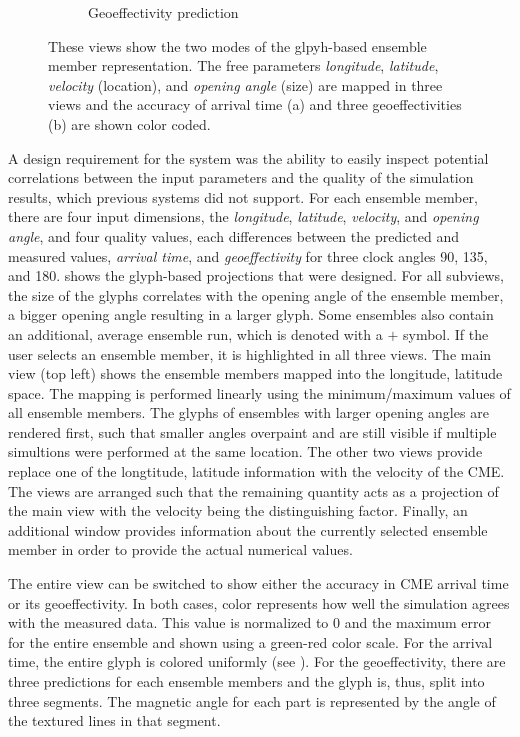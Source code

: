 \begin{figure}
\begin{subfigure}[b]{0.32\textwidth}
    \caption{Geoeffectivity prediction}
    \label{contributions:astro:spaceweather:ensemble:kp}
\end{subfigure}
\caption{These views show the two modes of the glpyh-based ensemble member representation.  The free parameters \emph{longitude}, \emph{latitude}, \emph{velocity} (location), and \emph{opening angle} (size) are mapped in three views and the accuracy of arrival time (a) and three geoeffectivities (b) are shown color coded.}
\label{contributions:astro:spaceweather:ensemble}
\end{figure}

A design requirement for the system was the ability to easily inspect potential correlations between the input parameters and the quality of the simulation results, which previous systems did not support.  For each ensemble member, there are four input dimensions, the \emph{longitude}, \emph{latitude}, \emph{velocity}, and \emph{opening angle}, and four quality values, each differences between the predicted and measured values, \emph{arrival time}, and \emph{geoeffectivity} for three clock angles 90\textdegree , 135\textdegree , and 180\textdegree .   shows the  glyph-based projections that were designed.  For all subviews, the size of the glyphs correlates with the opening angle of the ensemble member, a bigger opening angle resulting in a larger glyph.  Some ensembles also contain an additional, average ensemble run, which is denoted with a $+$ symbol.  If the user selects an ensemble member, it is highlighted in all three views.  The main view (top left) shows the ensemble members mapped into the longitude, latitude space.  The mapping is performed linearly using the minimum/maximum values of all ensemble members.  The glyphs of ensembles with larger opening angles are rendered first, such that smaller angles overpaint and are still visible if multiple simultions were performed at the same location.  The other two views provide replace one of the longtitude, latitude information with the velocity of the CME.  The views are arranged such that the remaining quantity acts as a projection of the main view with the velocity being the distinguishing factor.  Finally, an additional window provides information about the currently selected ensemble member in order to provide the actual numerical values.

The entire view can be switched to show either the accuracy in CME arrival time or its geoeffectivity.  In both cases, color represents how well the simulation agrees with the measured data.  This value is normalized to $0$ and the maximum error for the entire ensemble and shown using a green-red color scale.  For the arrival time, the entire glyph is colored uniformly (see ).  For the geoeffectivity, there are three predictions for each ensemble members and the glyph is, thus, split into three segments.  The magnetic angle for each part is represented by the angle of the textured lines in that segment.

